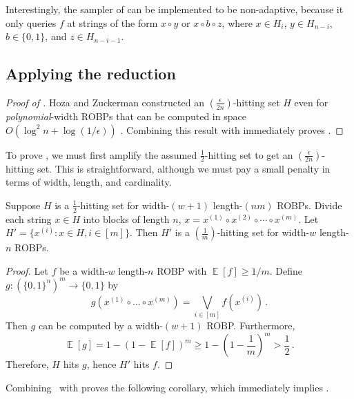 \documentclass{toc}
\DeclareMathOperator*{\ExpVal}{\mathbb{E}}
\begin{document}
Interestingly, the sampler of  can be implemented to be non-adaptive, because it only queries $f$ at strings of the form $x \circ y$ or $x \circ b \circ z$, where $x \in H_i$, $y \in H_{n - i}$, $b \in \{0, 1\}$, and $z \in H_{n - i - 1}$.

\subsection{Applying the reduction}

\begin{proof}[Proof of ]
Hoza and Zuckerman constructed an $\left(\frac{\epsilon}{2n}\right)$-hitting set $H$ even for \emph{polynomial}-width ROBPs that can be computed in space $O(\log^2 n + \log(1/\epsilon))$ \cite{HZ20}. Combining this result with  immediately proves .
\end{proof}

To prove , we must first amplify the assumed $\frac{1}{2}$-hitting set to get an $\left(\frac{\epsilon}{2n}\right)$-hitting set. This is straightforward, although we must pay a small penalty in terms of width, length, and cardinality.
\begin{lemma} \label{lem:hitting-set-amplification}
Suppose $H$ is a $\frac{1}{2}$-hitting set for width-$(w + 1)$ length-$(nm)$ ROBPs. Divide each string $x \in H$ into blocks of length $n$, $x = x^{(1)} \circ x^{(2)} \circ \cdots \circ x^{(m)}$. Let $H' = \{x^{(i)} : x \in H, i \in [m]\}$. Then $H'$ is a $(\frac{1}{m})$-hitting set for width-$w$ length-$n$ ROBPs.
\end{lemma}

\begin{proof}
Let $f$ be a width-$w$ length-$n$ ROBP with $\ExpVal[f] \geq 1/m$. Define $g \colon (\{0, 1\}^n)^m \to \{0, 1\}$ by
$$
g(x^{(1)} \circ \dots \circ x^{(m)}) = \bigvee_{i \in [m]} f(x^{(i)})\,.
$$
Then $g$ can be computed by a width-$(w + 1)$ ROBP. Furthermore,
$$
\ExpVal[g] = 1 - (1 - \ExpVal[f])^m \geq 1 - \left(1 - \frac{1}{m}\right)^m > \frac{1}{2}\,.
$$
Therefore, $H$ hits $g$, hence $H'$ hits $f$.
\end{proof}

Combining~ with  proves the following corollary, which immediately implies .
\end{document}

